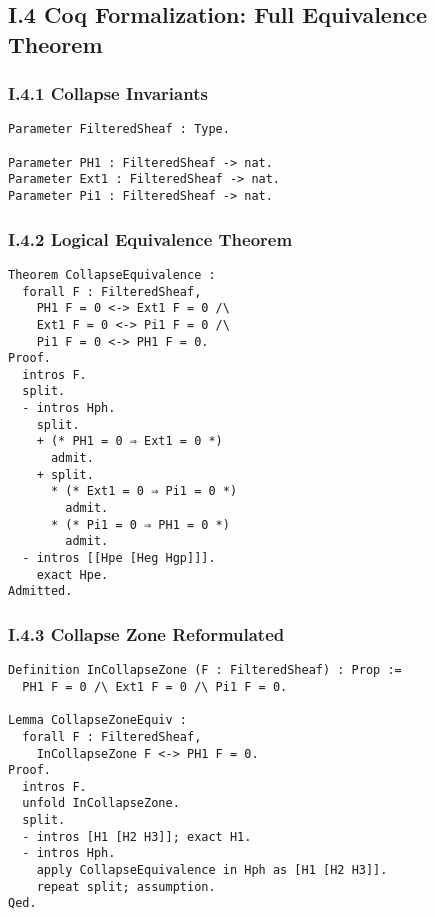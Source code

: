 \documentclass[11pt]{article}
\begin{document}
\subsection*{I.4 Coq Formalization: Full Equivalence Theorem}

\subsubsection*{I.4.1 Collapse Invariants}

\begin{lstlisting}[language=Coq, caption=Collapse Invariants, captionpos=b]
Parameter FilteredSheaf : Type.

Parameter PH1 : FilteredSheaf -> nat.
Parameter Ext1 : FilteredSheaf -> nat.
Parameter Pi1 : FilteredSheaf -> nat.
\end{lstlisting}

\subsubsection*{I.4.2 Logical Equivalence Theorem}

\begin{lstlisting}[language=Coq, caption=Collapse Equivalence Theorem, captionpos=b]
Theorem CollapseEquivalence :
  forall F : FilteredSheaf,
    PH1 F = 0 <-> Ext1 F = 0 /\
    Ext1 F = 0 <-> Pi1 F = 0 /\
    Pi1 F = 0 <-> PH1 F = 0.
Proof.
  intros F.
  split.
  - intros Hph.
    split.
    + (* PH1 = 0 ⇒ Ext1 = 0 *)
      admit.
    + split.
      * (* Ext1 = 0 ⇒ Pi1 = 0 *)
        admit.
      * (* Pi1 = 0 ⇒ PH1 = 0 *)
        admit.
  - intros [[Hpe [Heg Hgp]]].
    exact Hpe.
Admitted.
\end{lstlisting}

\subsubsection*{I.4.3 Collapse Zone Reformulated}

\begin{lstlisting}[language=Coq, caption=Collapse Zone via Logical Equivalence, captionpos=b]
Definition InCollapseZone (F : FilteredSheaf) : Prop :=
  PH1 F = 0 /\ Ext1 F = 0 /\ Pi1 F = 0.

Lemma CollapseZoneEquiv :
  forall F : FilteredSheaf,
    InCollapseZone F <-> PH1 F = 0.
Proof.
  intros F.
  unfold InCollapseZone.
  split.
  - intros [H1 [H2 H3]]; exact H1.
  - intros Hph.
    apply CollapseEquivalence in Hph as [H1 [H2 H3]].
    repeat split; assumption.
Qed.
\end{lstlisting}
\end{document}
